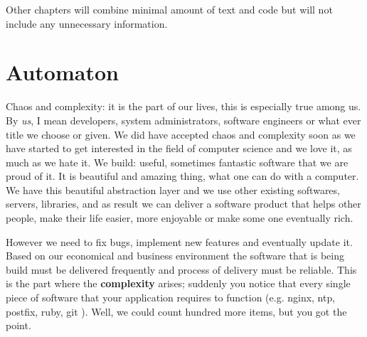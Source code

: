 \documentclass[10pt]{book}
\begin{document}
Other chapters will combine minimal amount of text and code but will not include 
any unnecessary information.

\normalsize
\clearemptydoublepage




\begin{latexonly}
\tableofcontents
\clearemptydoublepage
\end{latexonly}








\mainmatter

\chapter{Automaton}
Chaos and complexity: it is the part of our lives, this is especially true among 
us. By \emph{us}, I mean developers, system administrators, software engineers or what ever title we 
choose or given. We did have accepted chaos and complexity soon as we have 
started to get interested in the field of computer science and we love it, as 
much as we hate it. We build: useful, sometimes fantastic software that we are proud of it. 
It is beautiful and amazing thing, what one can do with a computer. 
We have this beautiful abstraction layer and we use other existing softwares, servers, 
libraries, and as result we can deliver a software product that helps other people, make their life easier, 
more enjoyable or make some one eventually rich. 

However we need to fix bugs, implement new features and eventually update it.
Based on our economical and business environment the software that is being 
build must be delivered frequently and process of delivery must be reliable. 
This is the part where the {\bf complexity} arises; suddenly you notice that every 
single piece of software that your application requires to function (e.g. nginx, ntp, postfix, ruby, git ). 
Well, we could count hundred more items, but you got the point. 
\end{document}
